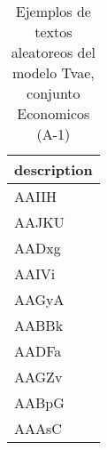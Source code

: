 \begin{table}[H]
\centering
\fontsize{8}{14}\selectfont
\caption{Ejemplos de textos aleatoreos del modelo Tvae, conjunto Economicos (A-1)}
\label{table-sample10-economicos-a-1-tvae-text}
\begin{tabular}{|m{50em}|}
\hline
\rowcolor[gray]{0.8}
description \\
\hline AAIIH \\
\hline AAJKU \\
\hline AADxg \\
\hline AAIVi \\
\hline AAGyA \\
\hline AABBk \\
\hline AADFa \\
\hline AAGZv \\
\hline AABpG \\
\hline AAAsC \\
\hline
\end{tabular}
\end{table}
